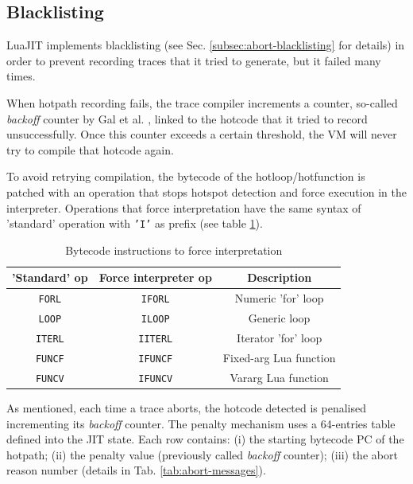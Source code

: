 \subsection{Blacklisting}
\label{subsec:luajit-black}
LuaJIT implements blacklisting (see Sec. \ref{subsec:abort-blacklisting} for details) in order to prevent recording traces that it tried to generate, but it failed many times. 

When hotpath recording fails, the trace compiler increments a counter, so-called \textit{backoff} counter by Gal et al. \cite{gal2009trace}, linked to the hotcode that it tried to record unsuccessfully. Once this counter exceeds a certain threshold, the VM will never try to compile that hotcode again.

To avoid retrying compilation, the bytecode of the hotloop/hotfunction is patched with an operation that stops hotspot detection and force execution in the interpreter. Operations that force interpretation have the same syntax of 'standard' operation with \texttt{'I'} as prefix (see table \ref{tab:blacklistin-operations}).

\begin{table}[H]
    \centering
    \begin{tabular}{|c|c|c|}
        \hline
        'Standard' op & Force interpreter op & Description \\
        \hline
        \texttt{FORL} & \texttt{IFORL} & Numeric 'for' loop\\
        \texttt{LOOP} &  \texttt{ILOOP} & Generic loop\\
        \texttt{ITERL} & \texttt{IITERL} & Iterator 'for' loop\\
        \texttt{FUNCF} & \texttt{IFUNCF} & Fixed-arg Lua function\\
        \texttt{FUNCV} & \texttt{IFUNCV} & Vararg Lua function\\
        \hline
    \end{tabular}
    \caption{Bytecode instructions to force interpretation}
    \label{tab:blacklistin-operations}
\end{table}

\noindent
As mentioned, each time a trace aborts, the hotcode detected is penalised incrementing its \textit{backoff} counter. The penalty mechanism uses a 64-entries table defined into the JIT state. Each row contains: (i) the starting bytecode PC of the hotpath; (ii) the penalty value (previously called \textit{backoff} counter); (iii) the abort reason number (details in Tab. \ref{tab:abort-messages}). 

